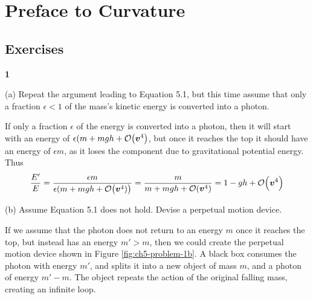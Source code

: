 \documentclass[gr-notes.tex]{subfiles}
\begin{document}
\setcounter{chapter}{4}

\chapter{Preface to Curvature}

\setcounter{section}{7}

\section{Exercises}

\textbf{1}

(a)
Repeat the argument leading to Equation 5.1, but this time assume that only a fraction $\epsilon < 1$ of the mass's kinetic energy is converted into a photon.

If only a fraction $\epsilon$ of the energy is converted into a photon, then it will start with an energy of $\epsilon (m + mgh + \order{\boldsymbol{v}^4}$, but once it reaches the top it should have an energy of $\epsilon m$, as it loses the component due to gravitational potential energy. Thus
%
\begin{displaymath}
  \frac{E'}{E} =
  \frac{\epsilon m}{\epsilon (m + mgh + \order{\boldsymbol{v}^4)}} =
  \frac{m}{m + mgh + \order{\boldsymbol{v}^4}} =
  1 - gh + \order{\boldsymbol{v}^4}
\end{displaymath}

(b)
Assume Equation 5.1 does not hold. Devise a perpetual motion device.

If we assume that the photon does not return to an energy $m$ once it reaches the top, but instead has an energy $m' > m$, then we could create the perpetual motion device shown in Figure \ref{fig:ch5-problem-1b}. A black box consumes the photon with energy $m'$, and splits it into a new object of mass $m$, and a photon of energy $m' - m$. The object repeats the action of the original falling mass, creating an infinite loop.
\end{document}
